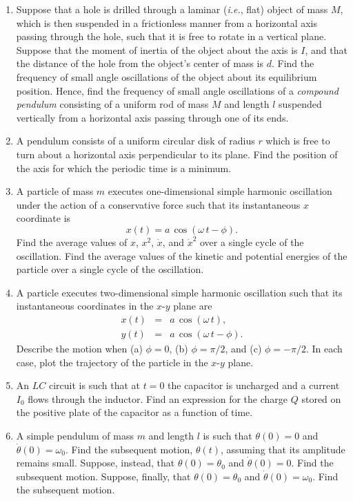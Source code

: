 {\begin{enumerate}
\item Suppose that a hole is drilled through a laminar ({\em i.e.}, flat) object
of mass $M$, which is then suspended in a frictionless manner from a horizontal
axis passing through the hole, such that it is free to rotate in a vertical plane.
 Suppose that the moment of inertia of the object about the
axis is $I$, and that the distance of the hole from the object's center of mass is $d$. 
Find the frequency of small angle oscillations of the object about its
equilibrium position. Hence, find the frequency of small angle oscillations of a {\em compound pendulum}\/
consisting of a uniform
rod of mass $M$ and length $l$ suspended vertically from a horizontal axis
passing through one of its ends. 

\item A pendulum consists of a uniform circular disk of radius $r$ which is
free to turn about a horizontal axis perpendicular to its plane. Find the position
of the axis for which the periodic time is a minimum. 

\item A particle of mass $m$ executes one-dimensional simple harmonic oscillation  under the action of a
conservative force such that its instantaneous $x$ coordinate is
$$
x(t) = a\,\cos(\omega\,t-\phi).
$$
Find the average values of $x$, $x^2$, $\dot{x}$, and $\dot{x}^2$ over a single cycle of the
oscillation. Find the average values of the kinetic and potential energies of the
particle over a single cycle of the oscillation.

\item A particle executes two-dimensional simple harmonic oscillation such that its instantaneous coordinates in the $x$-$y$
plane are
\begin{eqnarray}
x(t) &=&a\,\cos(\omega\,t),\nonumber\\[0.5ex]
y(t) &=&a\,\cos(\omega\,t-\phi).\nonumber
\end{eqnarray}
Describe the motion when (a) $\phi=0$, (b) $\phi=\pi/2$, and (c) $\phi=-\pi/2$.
In each case, plot the trajectory of the particle in the $x$-$y$ plane.

\item An $LC$ circuit is such that at $t=0$ the capacitor is uncharged and a
current $I_0$ flows through the inductor. Find an expression for the
charge $Q$ stored on the positive plate of the capacitor as a function of time.

\item A simple pendulum of mass $m$ and length $l$ is such that $\theta(0)=0$
and $\dot{\theta}(0) = \omega_0$. Find the subsequent motion, $\theta(t)$, assuming that 
its amplitude  remains small. Suppose, instead, that  $\theta(0)=\theta_0$ and
$\dot{\theta}(0) = 0$. Find the subsequent motion. Suppose, finally, that
$\theta(0)=\theta_0$ and $\dot{\theta}(0) = \omega_0$. Find the subsequent motion.


\end{enumerate}}
